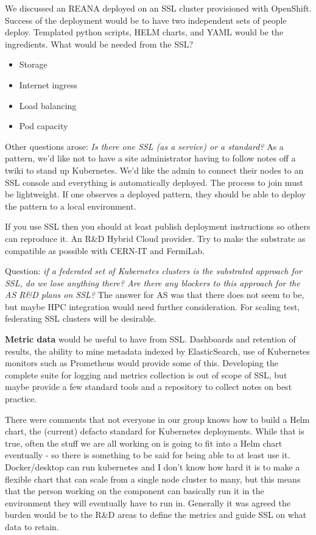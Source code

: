 \documentclass[11pt,letterpaper,fleqn]{article}
\begin{document}
We discussed an REANA deployed on an SSL cluster provisioned with OpenShift. Success of the deployment would be to have two independent sets of people deploy. Templated python scripts, HELM charts, and YAML would be the ingredients.  What would be needed from the SSL?

\begin{itemize}
  \item Storage
  \item Internet ingress
  \item Load balancing
  \item Pod capacity
\end{itemize}

Other questions arose: {\it Is there one SSL (as a service) or a standard?} As a pattern, we'd like not to have a site administrator having to follow notes off a twiki to stand up Kubernetes. We’d like the admin to connect their nodes to an SSL console and everything is automatically deployed. The process to join must be lightweight. If one observes a deployed pattern, they should be able to deploy the pattern to a local environment.

If you use SSL then you should at least publish deployment instructions so others can reproduce it. An R\&D Hybrid Cloud provider. Try to make the substrate as compatible as possible with CERN-IT and FermiLab.

Question: {\it if a federated set of Kubernetes clusters is the substrated approach for SSL, do we lose anything there? Are there any blockers to this approach for the AS R\&D plans on SSL?}  The answer for AS was that there does not seem to be, but maybe HPC integration would need further consideration. For scaling test, federating SSL clusters will be desirable.

{\bf Metric data} would be useful to have from SSL.  Dashboards and retention of results, the ability to mine metadata indexed by ElasticSearch, use of Kubernetes monitors such as Prometheus would provide some of this.  Developing the complete suite for logging and metrics collection is out of scope of SSL, but maybe provide a few standard tools and a repository to collect notes on best practice.

There were comments that not everyone in our group knows how to build a Helm chart, the (current) defacto standard for Kubernetes deployments. While that is true, often the stuff we are all working on is going to fit into a Helm chart eventually - so there is something to be said for being able to at least use it. Docker/desktop can run kubernetes and I don’t know how hard it is to make a flexible chart that can scale from a single node cluster to many, but this means that the person working on the component can basically run it in the environment they will eventually have to run in. Generally it was agreed the burden would be to the R\&D areas to define the metrics and guide SSL on what data to retain.
\end{document}

